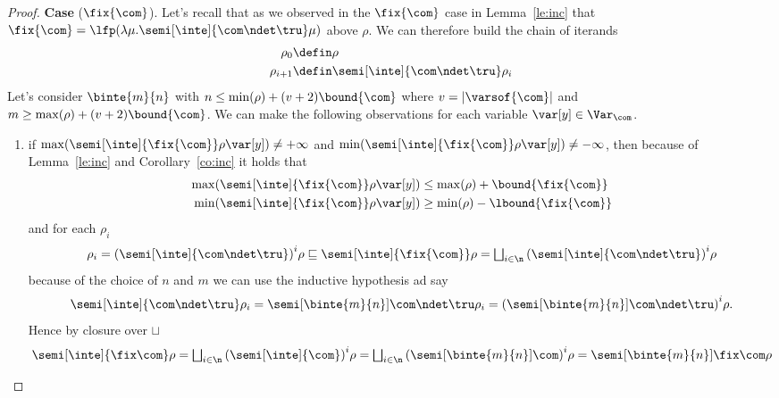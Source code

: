 \begin{proof}
  \noindent
  \textbf{Case} (\(\fix{\com}\)).
  Let's recall that as we observed in the \(\fix{\com}\) case in
  Lemma~\ref{le:inc} that
  \({\fix{\com} = \lfp(\lambda \mu . \semi[\inte]{\com \ndet
      \tru}\mu)}\) above \(\rho\). We can therefore build the chain of
  iterands
  \begin{align*}
    \rho_0 & \defin \rho \\
    \rho_{i+1} & \defin \semi[\inte]{\com \ndet \tru}\rho_i
  \end{align*}
  Let's consider \(\binte{m}{n}\) with
  \(n \leq \min(\rho) + (v+2)\bound{\com}\) where
  \(v = |\varsof{\com}|\) and
  \(m \geq \max(\rho) + (v+2)\bound{\com}\). We can make the following
  observations for each variable \(\var[y]\in \Var_{\com}\).
  \begin{enumerate}[label=(\roman*)]
  \item if
    \({\max(\semi[\inte]{\fix{\com}}\rho\var[y]) \neq +\infty}\) and
    \({\min(\semi[\inte]{\fix{\com}}\rho\var[y]) \neq -\infty}\), then
    because of Lemma~\ref{le:inc} and Corollary~\ref{co:inc} it holds
    that
    \begin{align*}
      \max(\semi[\inte]{\fix{\com}}\rho\var[y]) & \leq \max(\rho) + \bound{\fix{\com}} \\
      \min(\semi[\inte]{\fix{\com}}\rho\var[y]) & \geq \min(\rho) - \lbound{\fix{\com}}
    \end{align*}
    and for each \(\rho_i\)
    \begin{equation*}
      \rho_i = {\left(\semi[\inte]{\com \ndet \tru}\right)}^i\rho \sqsubseteq
      \semi[\inte]{\fix{\com}}\rho = 
      \textstyle\bigsqcup_{i\in\n} {\left(\semi[\inte]{\com \ndet \tru}\right)}^i\rho
    \end{equation*}
    because of the choice of \(n\) and \(m\) we can use the inductive
    hypothesis ad say
    \begin{equation*}
      \semi[\inte]{\com \ndet \tru}\rho_i =
      \semi[\binte{m}{n}]{\com \ndet \tru}\rho_i =
      {\left(\semi[\binte{m}{n}]{\com\ndet \tru}\right)}^i\rho.
    \end{equation*}
    Hence  by closure over \(\sqcup\)
    \begin{equation*}
      \semi[\inte]{\fix\com}\rho =
      \textstyle\bigsqcup_{i\in\n} {\left(\semi[\inte]{\com}\right)}^i\rho = 
      \textstyle\bigsqcup_{i\in\n} {\left(\semi[\binte{m}{n}]{\com}\right)}^i\rho = 
      \semi[\binte{m}{n}]{\fix\com}\rho
    \end{equation*}
    

\end{enumerate}
\end{proof}
